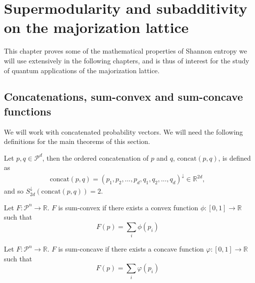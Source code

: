 \chapter{Supermodularity and subadditivity on the majorization lattice} \label{chap:alternative}

This chapter proves some of the mathematical properties of Shannon entropy we will use extensively in the following chapters, and is thus of interest for the study of quantum applications of the majorization lattice.

\section{Concatenations, sum-convex and sum-concave functions}

We will work with concatenated probability vectors. We will need the following definitions for the main theorems of this section.

\begin{definition} \label{def:concatenation}
    Let $p, q \in \mathcal{P}^d$, then the ordered concatenation of $p$ and $q$, $\text{concat}(p, q)$, is defined as
    \begin{align}
        \text{concat}(p, q) = (p_1, p_2, ..., p_d, q_1, q_2, ..., q_d)^\downarrow \in \mathbb{R}^{2d},
    \end{align}
    and so $S^\downarrow_{2d}(\text{concat}(p, q)) = 2$.
\end{definition}

\begin{definition} \label{def:sum-convex} %
    Let $F: \mathcal{P}^n \rightarrow \mathbb{R}$. $F$ is sum-convex if there exists a convex function $\phi: [0, 1] \rightarrow \mathbb{R}$ such that
    \begin{equation} \label{eq:sum-convex}
        F(p) = \sum_i \phi(p_i)
    \end{equation}
\end{definition}

\begin{definition} \label{def:sum-concave} %
    Let $F: \mathcal{P}^n \rightarrow \mathbb{R}$. $F$ is sum-concave if there exists a concave function $\varphi: [0, 1] \rightarrow \mathbb{R}$ such that
    \begin{equation} \label{eq:sum-concave}
        F(p) = \sum_i \varphi(p_i)
    \end{equation}
\end{definition}


